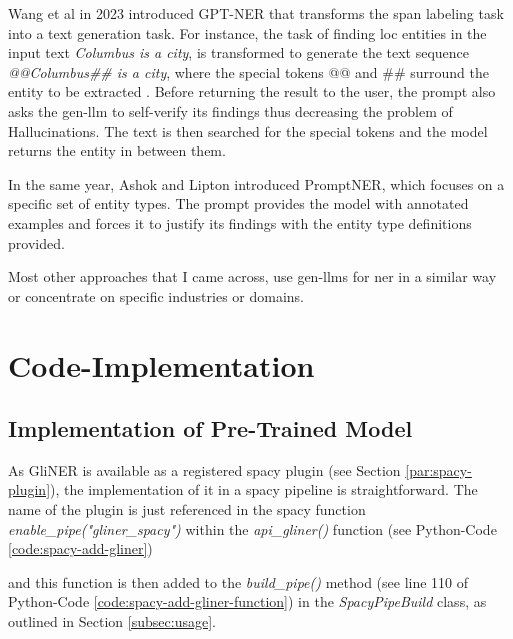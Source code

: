 Wang et al \cite{gptner} in 2023 introduced GPT-NER that transforms the \gls{span} labeling task into a text generation task.
For instance, the task of finding \gls{loc} entities in the input text \emph{Columbus is a city}, is transformed to generate the text sequence \emph{@@Columbus\#\# is a city}, where the special \glspl{token} @@ and \#\# surround the entity to be extracted \cite{gptner}.
Before returning the result to the user, the \gls{prompt} also asks the \gls{gen-llm} to self-verify its findings thus decreasing the problem of \glspl{Hallucination}.
The text is then searched for the special \glspl{token} and the model returns the entity in between them.

In the same year, Ashok and Lipton \cite{promptner} introduced PromptNER, which focuses on a specific set of entity types.
The \gls{prompt} provides the model with annotated examples and forces it to justify its findings with the entity type definitions provided.

Most other approaches that I came across, use \glspl{gen-llm} for \gls{ner} in a similar way or concentrate on specific industries or domains.

\section{Code-Implementation}\label{sec:code-implementation}

\subsection{Implementation of Pre-Trained Model}
As GliNER \cite{gliner} is available as a registered spacy plugin (see Section \ref{par:spacy-plugin}), the implementation of it in a spacy pipeline is straightforward.
The name of the plugin is just referenced in the spacy function \emph{enable\_pipe("gliner\_spacy")} within the \emph{api\_gliner()} function (see Python-Code \ref{code:spacy-add-gliner})


and this function is then added to the \emph{build\_pipe()} method (see line 110 of Python-Code \ref{code:spacy-add-gliner-function}) in the \emph{SpacyPipeBuild} class, as outlined in Section \ref{subsec:usage}.

